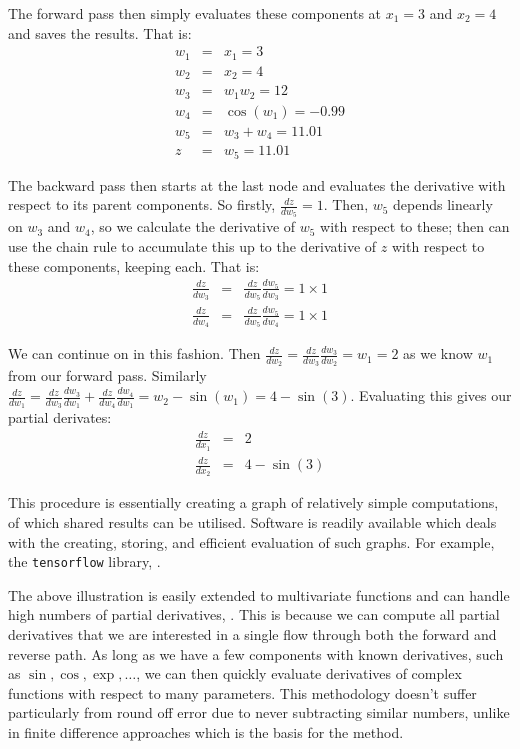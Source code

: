 The forward pass then simply evaluates these components at $x_1=3$ and $x_2=4$ and saves the results.
That is: 
\begin{eqnarray*}
	w_1 &=& x_1 = 3 \\
	w_2 &=& x_2 = 4\\
	w_3 &=& w_1 w_2 = 12 \\
	w_4 &=& \cos\left(w_1\right) = -0.99 \\
	w_5 &=& w_3 + w_4  = 11.01\\
	z &=& w_5 = 11.01
\end{eqnarray*}

The backward pass then starts at the last node and evaluates the derivative with respect to its parent components.
So firstly, $\frac{dz}{dw_5} = 1$.
Then, $w_5$ depends linearly on $w_3$ and $w_4$, so we calculate the derivative of $w_5$ with respect to these; then can use the chain rule to accumulate this up to the derivative of $z$ with respect to these components, keeping each. 
That is:
\begin{eqnarray*}
	\frac{dz}{dw_3} &=& \frac{dz}{dw_5}\frac{dw_5}{dw_3} = 1 \times 1 \\
	\frac{dz}{dw_4} &=& \frac{dz}{dw_5}\frac{dw_5}{dw_4} = 1 \times 1
\end{eqnarray*}

We can continue on in this fashion.
Then $\frac{dz}{dw_2} = \frac{dz}{dw_3}\frac{dw_3}{dw_2} = w_1 = 2$ as we know $w_1$ from our forward pass.
Similarly $\frac{dz}{dw_1} = \frac{dz}{dw_3}\frac{dw_3}{dw_1} +  \frac{dz}{dw_4}\frac{dw_4}{dw_1}= w_2 - \sin(w_1)= 4 - \sin(3)$.
Evaluating this gives our partial derivates:
\begin{eqnarray*}
	\frac{dz}{dx_1} &=& 2 \\
	\frac{dz}{dx_2} &=& 4 - \sin(3)
\end{eqnarray*}

This procedure is essentially creating a graph of relatively simple computations, of which shared results can be utilised.
Software is readily available which deals with the creating, storing, and efficient evaluation of such graphs.
For example, the \verb*|tensorflow| library, \citep{abadi_tensorflow_2016}.

The above illustration is easily extended to multivariate functions and can handle high numbers of partial derivatives, \citep{neidinger_introduction_2010}.
This is because we can compute all partial derivatives that we are interested in a single flow through both the forward and reverse path.
As long as we have a few components with known derivatives, such as $\sin, \cos, \exp, \dots$, we can then quickly evaluate derivatives of complex functions with respect to many parameters.
This methodology doesn't suffer particularly from round off error due to never subtracting similar numbers, unlike in finite difference approaches which is the basis for the method.

